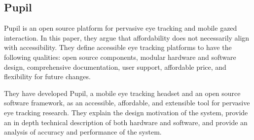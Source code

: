 \subsection{Pupil}
Pupil is an open source platform for pervasive eye tracking and mobile gazed interaction. In this paper, they argue that affordability does not necessarily align with accessibility. They define accessible eye tracking platforms to have the following qualities: open source components, modular hardware and software design, comprehensive documentation, user support, affordable price, and flexibility for future changes. \bigskip

They have developed Pupil, a mobile eye tracking headset and an open source software framework, as an accessible, affordable, and extensible tool for pervasive eye tracking research. They explain the design motivation of the system, provide an in depth technical description of both hardware and software, and provide an analysis of accuracy and performance of the system.
